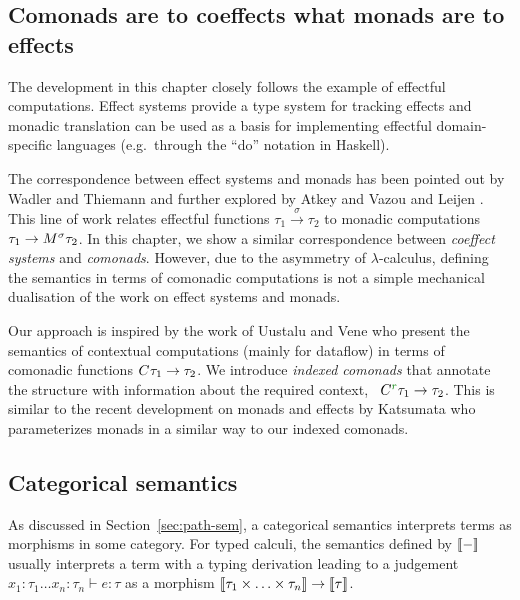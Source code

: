 
\subsection{Comonads are to coeffects what monads are to effects}

The development in this chapter closely follows the example of effectful computations.
Effect systems provide a type system for tracking effects and monadic translation can be used as
a basis for implementing effectful domain-specific languages (e.g.~through the ``do'' notation in
Haskell).

The correspondence between effect systems and monads has been pointed out by Wadler and Thiemann
\cite{monads-effects-marriage} and further explored by Atkey \cite{monads-parameterised-notions}
and Vazou and Leijen \cite{monads-effects-remarriage}. This line of work relates effectful
functions $\tau_1 \xrightarrow{\sigma} \tau_2$ to monadic computations
$\tau_1 \rightarrow M^{\sigma}\tau_2$. In this chapter, we show a similar correspondence between
\emph{coeffect systems} and \emph{comonads}. However, due to the asymmetry of $\lambda$-calculus,
defining the semantics in terms of comonadic computations is not a simple mechanical dualisation
of the work on effect systems and monads.

Our approach is inspired by the work of Uustalu and Vene \cite{comonads-notions} who present the
semantics of contextual computations (mainly for dataflow) in terms of comonadic functions
$C^{}\tau_1 \rightarrow \tau_2$. We introduce \emph{indexed comonads} that annotate the structure
with information about the required context, \ie~$\ctyp{\cclrd{r}} \tau_1 \rightarrow \tau_2$.
This is similar to the recent development on monads and effects by Katsumata \cite{monads-parametric}
who parameterizes monads in a similar way to our indexed comonads.


\subsection{Categorical semantics}

As discussed in Section~\ref{sec:path-sem}, a categorical semantics interprets terms as morphisms
in some category. For typed calculi, the semantics defined by $\llbracket - \rrbracket$ usually interprets a term
with a typing derivation leading to a judgement $x_1 \!:\! \tau_1 \ldots x_n \!:\! \tau_n \vdash e: \tau$
as a morphism $\llbracket \tau_1 \times \ldots \times \tau_n \rrbracket \rightarrow \llbracket \tau \rrbracket$.

